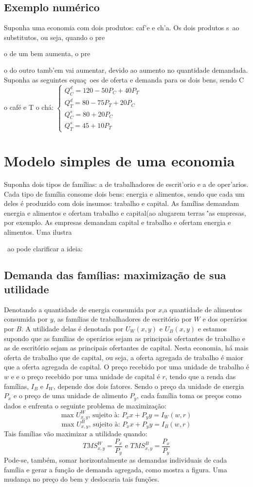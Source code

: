 \documentclass[oneside,12pt, letterpaper]{book}
\begin{document}
\section{Exemplo num{\'e}rico}
Suponha uma economia com dois produtos: caf{'e} e ch{'a}. Os dois produtos s{~a}o substitutos, ou seja, quando o pre{o de um bem aumenta, o pre{o do outro tamb{'e}m vai
aumentar, devido ao aumento no quantidade demandada. Suponha as seguintes equa{\c c}{~o}es de oferta e demanda para os dois bens, sendo C o caf{\'e} e T o ch{\'a}: 
\newline $ \begin{cases} Q^d_C = 120 - 50P_C + 40P_T \\ Q^d_T = 80 - 75P_T + 20P_C \\ Q^s_C = 80 + 20P_C \\ Q^s_T = 45 + 10P_T  \end{cases}   $

\chapter{Modelo simples de uma economia}
Suponha dois tipos de fam{\'i}lias: a de trabalhadores de escrit{'o}rio e a de oper{'a}rios. Cada tipo de fam{\'i}lia consome dois bens: energia e alimentos, sendo que
cada um deles {\'e} produzido com dois insumos: trabalho e capital. As fam{\'i}lias demandam energia e alimentos e ofertam trabalho e capital(ao alugarem
terras {\''a}s empresas, por exemplo. As empresas demandam capital e trabalho e ofertam energia e alimentos. Uma ilustra{{~a}o pode clarificar a ideia:
\section{Demanda das fam{\'i}lias: maximiza{\c c}{\~a}o de sua utilidade} 
Denotando a quantidade de energia consumida por $x$,a quantidade de alimentos consumida por $y$, as fam{\'i}lias de trabalhadores de escrit{\'o}rio por $W$ e dos
oper{\'a}rios por $B$. A utilidade delas {\'e} denotada por $U_W(x,y)$ e $U_B(x,y)$ e estamos supondo que as fam{\'i}lias de operários sejam as principais ofertantes de
trabalho e as de escrit{\'o}rio sejam as principais ofertantes de capital. Nesta economia, h{\'a} mais oferta de trabalho que de capital, ou seja, a oferta agregada de
trabalho {\'e} maior que a oferta agregada de capital. O pre{\c c}o recebido por uma unidade de trabalho {\'e} $w$ e e o pre{\c c}o recebido por uma unidade de capital é $r$,
tendo que a renda das fam{\'i}lias, $I_B$ e $I_W$, depende dos dois fatores. Sendo o pre{\c c}o da unidade de energia $P_x$ e o pre{\c c}o de uma unidade de alimento $P_y$, cada
fam{\'i}lia toma os pre{\c c}os como dados e enfrenta o seguinte problema de maximiza{\c c}{\~a}o: \[ \text{max }U^W_{x,y}  \text{, sujeito {\`a}: }P_xx + P_yy = I_W(w,r)  \]
\[ \text{max }U^B_{x,y}  \text{, sujeito {\`a}: }P_xx + P_yy = I_B(w,r)  \] 
Tais fam{\'i}lias v{\~a}o maximizar a utilidade quando: 
\[ TMS^W_{x,y} = \frac{P_x}{P_y} \text{   e   } TMS^B_{x,y} = \frac{P_x}{P_y} \]
Pode-se, tamb{\'e}m, somar horizontalmente as demandas individuais de cada fam{\'i}lia e gerar a fun{\c c}{\~a}o de demanda agregada, como mostra a figura. Uma mudan{\c c}a no pre{\c c}o
do bem y deslocaria tais fun{\c c}{\~o}es. 
}}}
\end{document}
